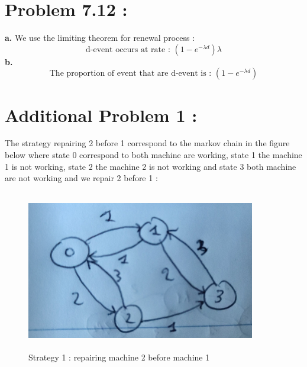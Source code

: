 \documentclass{article}
\begin{document}
\section*{Problem 7.12 :}
\textbf{a.} We use the limiting theorem for renewal process : $$\boxed{\text{d-event occurs at rate : }(1-e^{-\lambda d})\lambda}$$
\textbf{b.} $$\boxed{\text{The proportion of event that are d-event is : }(1-e^{-\lambda d})}$$
\section*{Additional Problem 1 :}
The strategy repairing 2 before 1 correspond to the markov chain in the figure below where state 0 correspond to both machine are working, state 1 the machine 1 is not working, state 2 the machine 2 is not working and state 3 both machine are not working and we repair 2 before 1 :
    
\begin{figure}[H]
    \begin{center}
        \includegraphics[width=10cm,height = 7cm]{img/srtategy1.png}
    \end{center}

    \caption{Strategy 1 : repairing machine 2 before machine 1}
    \label{label:markov}
\end{figure}
\end{document}
